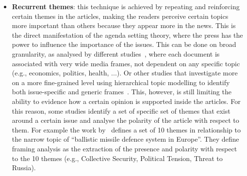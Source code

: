 \begin{itemize}
    \item \textbf{Recurrent themes}: this technique is achieved by repeating and reinforcing certain themes in the articles, making the readers perceive certain topics more important than others because they appear more in the news. This is the direct manifestation of the agenda setting theory, where the press has the power to influence the importance of the issues.
    This can be done on broad granularity, as analysed by different studies~\cite{tsur2015frame,card2015media}, where each document is associated with very wide media frames, not dependent on any specific topic (e.g., economics, politics, health, ...).
    Or other studies that investigate more on a more fine-grained level using hierarchical topic modelling to identify both issue-specific and generic frames~\cite{boydstun2013making}.
    This, however, is still limiting the ability to evidence how a certain opinion is supported inside the articles. For this reason, some studies identify a set of specific set of themes that exist around a certain issue and analyse the polarity of the article with respect to them. For example the work by~\citet{morstatter2018identifying} defines a set of 10 themes in relationship to the narrow topic of ``ballistic missile defence system in Europe''. %
    They define framing analysis as the extraction of the presence and polarity with respect to the 10 themes (e.g., Collective Security, Political Tension, Threat to Russia).
    
    

\end{itemize}
